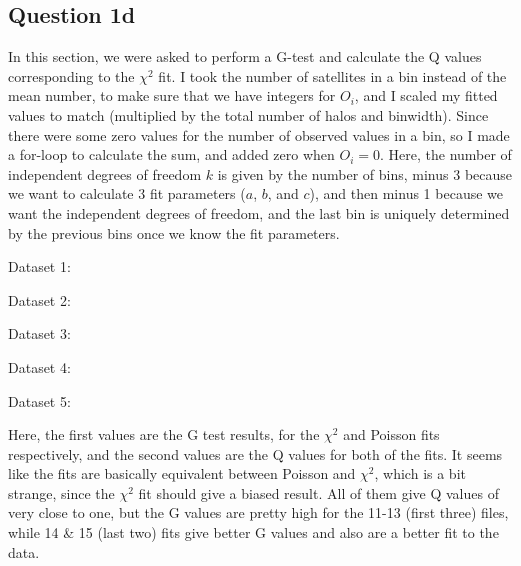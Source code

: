 \subsection{Question 1d}

In this section, we were asked to perform a G-test and calculate the Q values corresponding to the $\chi^2$ fit. 
I took the number of satellites in a bin instead of the mean number, to make sure that we have integers for $O_i$, and I scaled my fitted values to match (multiplied by the total number of halos and binwidth).
Since there were some zero values for the number of observed values in a bin, so I made a for-loop to calculate the sum, and added zero when $O_i = 0$.
Here, the number of independent degrees of freedom $k$ is given by the number of bins, minus 3 because we want to calculate 3 fit parameters ($a$, $b$, and $c$), and then minus 1 because we want the independent degrees of freedom, and the last bin is uniquely determined by the previous bins once we know the fit parameters.

Dataset 1:

Dataset 2:

Dataset 3:

Dataset 4:

Dataset 5:


Here, the first values are the G test results, for the $\chi^2$ and Poisson fits respectively, and the second values are the Q values for both of the fits.
It seems like the fits are basically equivalent between Poisson and $\chi^2$, which is a bit strange, since the $\chi^2$ fit should give a biased result. 
All of them give Q values of very close to one, but the G values are pretty high for the 11-13 (first three) files, while 14 & 15 (last two) fits give better G values and also are a better fit to the data.

